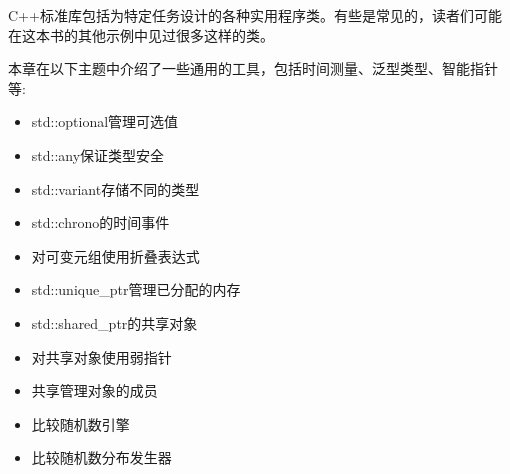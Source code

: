 C++标准库包括为特定任务设计的各种实用程序类。有些是常见的，读者们可能在这本书的其他示例中见过很多这样的类。

本章在以下主题中介绍了一些通用的工具，包括时间测量、泛型类型、智能指针等:

\begin{itemize}
\item 
std::optional管理可选值

\item 
std::any保证类型安全

\item 
std::variant存储不同的类型

\item 
std::chrono的时间事件

\item 
对可变元组使用折叠表达式

\item 
std::unique\_ptr管理已分配的内存

\item 
std::shared\_ptr的共享对象

\item 
对共享对象使用弱指针

\item 
共享管理对象的成员

\item 
比较随机数引擎

\item 
比较随机数分布发生器
\end{itemize}